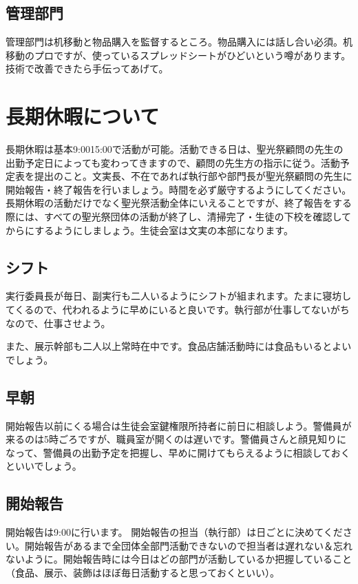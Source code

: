 \documentclass[dvipdfmx,jb5]{jarticle}
\begin{document}
\subsection{管理部門}
管理部門は机移動と物品購入を監督するところ。物品購入には話し合い必須。机移動のプロですが、使っているスプレッドシートがひどいという噂があります。技術で改善できたら手伝ってあげて。

\section{長期休暇について}
長期休暇は基本9:0015:00で活動が可能。活動できる日は、聖光祭顧問の先生の出勤予定日によっても変わってきますので、顧問の先生方の指示に従う。活動予定表を提出のこと。文実長、不在であれば執行部や部門長が聖光祭顧問の先生に開始報告・終了報告を行いましょう。時間を必ず厳守するようにしてください。長期休暇の活動だけでなく聖光祭活動全体にいえることですが、終了報告をする際には、すべての聖光祭団体の活動が終了し、清掃完了・生徒の下校を確認してからにするようにしましょう。生徒会室は文実の本部になります。

\subsection{シフト}
実行委員長が毎日、副実行も二人いるようにシフトが組まれます。たまに寝坊してくるので、代われるように早めにいると良いです。執行部が仕事してないがちなので、仕事させよう。

また、展示幹部も二人以上常時在中です。食品店舗活動時には食品もいるとよいでしょう。

\subsection{早朝}
開始報告以前にくる場合は生徒会室鍵権限所持者に前日に相談しよう。警備員が来るのは5時ごろですが、職員室が開くのは遅いです。警備員さんと顔見知りになって、警備員の出勤予定を把握し、早めに開けてもらえるように相談しておくといいでしょう。

\subsection{開始報告}
開始報告は9:00に行います。
開始報告の担当（執行部）は日ごとに決めてください。開始報告があるまで全団体全部門活動できないので担当者は遅れない＆忘れないように。開始報告時には今日はどの部門が活動しているか把握していること（食品、展示、装飾はほぼ毎日活動すると思っておくといい）。
\end{document}
